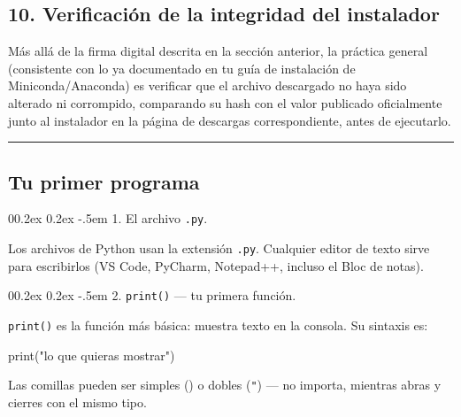 \documentclass[
  doc,
  floatsintext,
  longtable,
  a4paper,
  nolmodern,
  notxfonts,
  notimes,
  12pt,
  colorlinks=true,linkcolor=blue,citecolor=blue,urlcolor=blue]{apa7}
\makeatletter
\renewcommand{\paragraph}{\@startsection{paragraph}{4}{\parindent}%
	{0\baselineskip \@plus 0.2ex \@minus 0.2ex}%
	{-.5em}%
	{\normalfont\normalsize\bfseries\typesectitle}}
\newenvironment{Shaded}{\begin{snugshade}}{\end{snugshade}}
\newcommand{\BuiltInTok}[1]{\textcolor[rgb]{0.00,0.23,0.31}{#1}}
\newcommand{\NormalTok}[1]{\textcolor[rgb]{0.00,0.23,0.31}{#1}}
\newcommand{\StringTok}[1]{\textcolor[rgb]{0.13,0.47,0.30}{#1}}
\makeatother
\begin{document}
\subsection{10. Verificación de la integridad del
instalador}\label{verificaciuxf3n-de-la-integridad-del-instalador}

Más allá de la firma digital descrita en la sección anterior, la
práctica general (consistente con lo ya documentado en tu guía de
instalación de Miniconda/Anaconda) es verificar que el archivo
descargado no haya sido alterado ni corrompido, comparando su hash con
el valor publicado oficialmente junto al instalador en la página de
descargas correspondiente, antes de ejecutarlo.

\begin{center}\rule{0.5\linewidth}{0.5pt}\end{center}

\subsection{Tu primer programa}\label{tu-primer-programa}

\paragraph{\texorpdfstring{1. El archivo
\texttt{.py}.}{1. El archivo .py.}}\label{el-archivo-.py}

Los archivos de Python usan la extensión \texttt{.py}. Cualquier editor
de texto sirve para escribirlos (VS Code, PyCharm, Notepad++, incluso el
Bloc de notas).

\paragraph{\texorpdfstring{2. \texttt{print()} --- tu primera
función.}{2. print() --- tu primera función.}}\label{print-tu-primera-funciuxf3n}

\texttt{print()} es la función más básica: muestra texto en la consola.
Su sintaxis es:

\begin{Shaded}
\begin{Highlighting}[]
\BuiltInTok{print}\NormalTok{(}\StringTok{"lo que quieras mostrar"}\NormalTok{)}
\end{Highlighting}
\end{Shaded}

Las comillas pueden ser simples (\texttt{\textquotesingle{}}) o dobles
(\texttt{"}) --- no importa, mientras abras y cierres con el mismo tipo.
\end{document}
